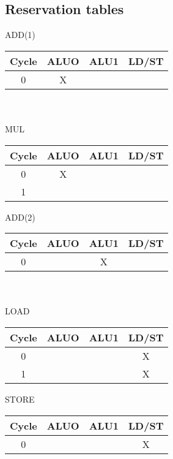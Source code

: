 \documentclass{report}
\begin{document}
\vspace{-3em}
\subsection{Reservation tables}
\vspace{-1em}
\begin{multicols}{3}
ADD(1) \\
\begin{tabular}{|c|c|c|c|}
  \hline
  Cycle & ALUO & ALU1 & LD/ST \\
  \hline
  0 & X    &      &       \\
  \hline
\end{tabular} \\ \ \\
MUL \\
\begin{tabular}{|c|c|c|c|}
  \hline
  Cycle & ALUO & ALU1 & LD/ST \\
  \hline
  0     & X    &      &       \\
  \hline
  1     &      &      &       \\
  \hline
\end{tabular}
  \vfill\columnbreak
ADD(2) \\
\begin{tabular}{|c|c|c|c|}
  \hline
  Cycle & ALUO & ALU1 & LD/ST \\
  \hline
  0     &      & X    &       \\
  \hline
\end{tabular} \\ \ \\
LOAD \\
\begin{tabular}{|c|c|c|c|}
  \hline
  Cycle & ALUO & ALU1 & LD/ST \\
  \hline
  0    &       &      & X     \\
  \hline 
  1    &       &      & X     \\
  \hline
\end{tabular}
  \vfill\columnbreak
STORE \\
\begin{tabular}{|c|c|c|c|}
  \hline
  Cycle & ALUO & ALU1 & LD/ST \\
  \hline
  0     &      &      & X     \\
  \hline
\end{tabular}
\end{multicols}
\end{document}
